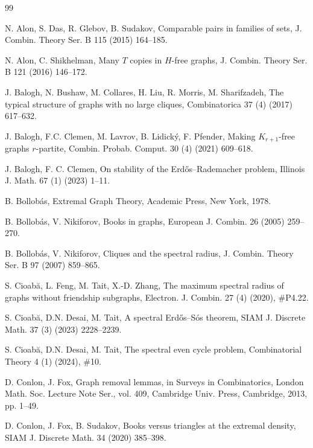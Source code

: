 \documentclass[11pt]{article}
\begin{document}
\frenchspacing
\begin{thebibliography}{99}

 N. Alon, S. Das, R. Glebov, B. Sudakov, 
 Comparable pairs in families of sets, 
 J. Combin. Theory Ser. B 115 (2015) 164--185.
 
N. Alon, C. Shikhelman, 
Many $T$ copies in $H$-free graphs, 
J. Combin. Theory Ser. B 121 (2016) 146--172.  

J. Balogh, N. Bushaw, M. Collares, H. Liu, R. Morris, M. Sharifzadeh, 
 The typical structure of graphs with no large cliques, 
 Combinatorica 37 (4) (2017)  617--632.
 
J. Balogh,  F.C. Clemen,  M. Lavrov, B. Lidick\'{y}, F. Pfender,  
Making $K_{r+1}$-free graphs $r$-partite, 
Combin. Probab. Comput. 30 (4) (2021) 609--618.
 
 J. Balogh, F. C. Clemen, 
 On stability of the Erd\H{o}s--Rademacher problem, 
 Illinois J. Math. 67 (1) (2023) 1--11.
 
B. Bollob\'as, 
Extremal Graph Theory, 
Academic Press, New York, 1978. 
 
B. Bollob\'{a}s, V. Nikiforov, 
Books in graphs, 
European J. Combin. 26 (2005) 259--270.  
 
B. Bollob\'{a}s, V. Nikiforov, 
Cliques and the spectral radius, 
 J. Combin. Theory Ser.  B 97 (2007) 859--865. 


 S. Cioab\u{a}, L. Feng, M. Tait, X.-D. Zhang, 
The maximum spectral radius of graphs without friendship subgraphs, 
 Electron. J. Combin. 27 (4) (2020), \#P4.22.

  S. Cioab\u{a}, D.N. Desai, M. Tait,
 A spectral Erd\H{o}s--S\'{o}s theorem,
 SIAM J. Discrete Math. 37 (3) (2023) 2228--2239. 
 
  S. Cioab\u{a}, D.N. Desai, M. Tait, 
  The spectral even cycle problem, 
  Combinatorial Theory 4 (1) (2024), \#10. 
  
 
D. Conlon, J. Fox, Graph removal lemmas, 
in Surveys in Combinatorics, 
London Math. Soc. Lecture Note Ser., vol. 409, 
Cambridge Univ. Press, Cambridge, 2013, pp. 1--49. 

D. Conlon, J. Fox, B. Sudakov, 
Books versus triangles at the extremal density, 
SIAM J. Discrete Math. 34 (2020) 385--398.


\end{thebibliography}
\end{document}
